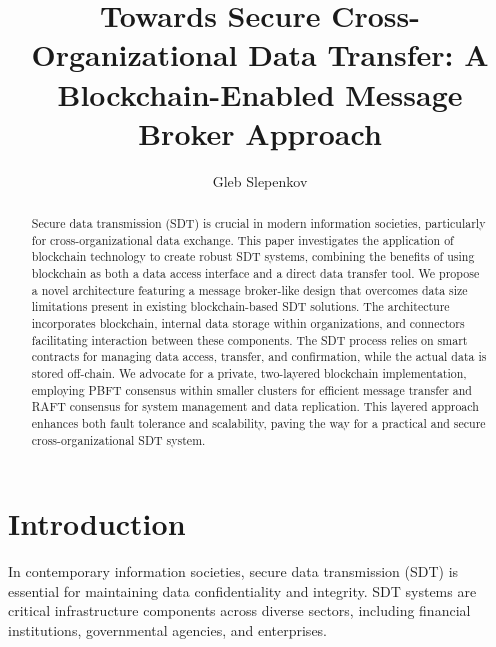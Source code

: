 \documentclass[10pt]{llncs}
\begin{document}
\title{Towards Secure Cross-Organizational Data Transfer: A Blockchain-Enabled Message Broker Approach}
\author{Gleb Slepenkov}

\maketitle

\begin{abstract}
    Secure data transmission (SDT) is crucial in modern information societies, particularly for cross-organizational data exchange. 
    This paper investigates the application of blockchain technology to create robust SDT systems, combining the benefits of using blockchain as both a data access interface and a direct data transfer tool. 
    We propose a novel architecture featuring a message broker-like design that overcomes data size limitations present in existing blockchain-based SDT solutions. 
    The architecture incorporates blockchain, internal data storage within organizations, and connectors facilitating interaction between these components. 
    The SDT process relies on smart contracts for managing data access, transfer, and confirmation, while the actual data is stored off-chain. 
    We advocate for a private, two-layered blockchain implementation, employing PBFT consensus within smaller clusters for efficient message transfer and RAFT consensus for system management and data replication. 
    This layered approach enhances both fault tolerance and scalability, paving the way for a practical and secure cross-organizational SDT system.
    
\end{abstract}

\section{Introduction}

In contemporary information societies, secure data transmission (SDT) is essential for maintaining data confidentiality and integrity.
SDT systems are critical infrastructure components across diverse sectors, including financial institutions, governmental agencies, and enterprises.
\end{document}
